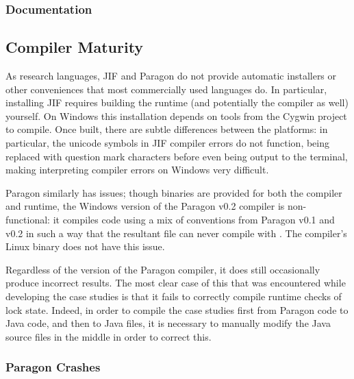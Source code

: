 \subsubsection{Documentation}



\subsection{Compiler Maturity}

As research languages, JIF and Paragon do not provide automatic installers or other conveniences that most commercially used languages do. In particular, installing JIF requires building the runtime (and potentially the compiler as well) yourself. On Windows this installation depends on tools from the Cygwin project \cite{cygwinpage} to compile. Once built, there are subtle differences between the platforms: in particular, the unicode symbols in JIF compiler errors do not function, being replaced with question mark characters before even being output to the terminal, making interpreting compiler errors on Windows very difficult.

Paragon similarly has issues; though binaries are provided for both the compiler and runtime, the Windows version of the Paragon v0.2 compiler is non-functional: it compiles code using a mix of conventions from Paragon v0.1 and v0.2 in such a way that the resultant  file can never compile with . The compiler's Linux binary does not have this issue.

Regardless of the version of the Paragon compiler, it does still occasionally produce incorrect results. The most clear case of this that was encountered while developing the case studies is that it fails to correctly compile runtime checks of lock state. Indeed, in order to compile the case studies first from Paragon code to Java code, and then to Java  files, it is necessary to manually modify the Java source files in the middle in order to correct this.

\subsubsection{Paragon Crashes}